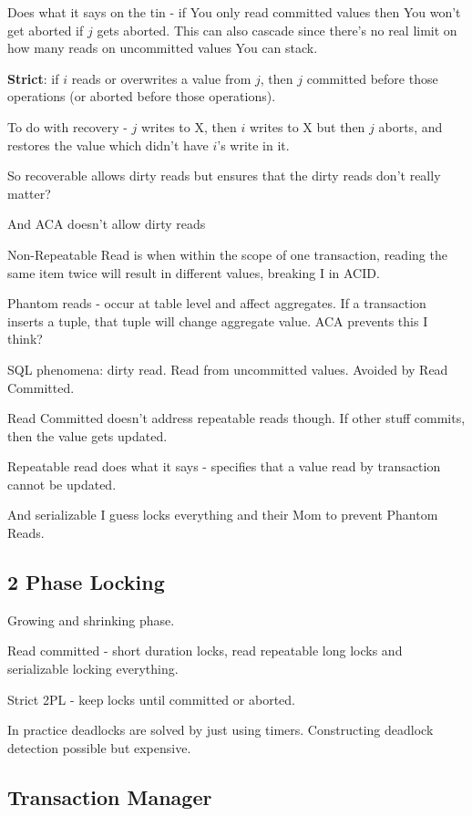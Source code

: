 \documentclass{article}
\begin{document}
		Does what it says on the tin - if You only read committed values then You won't get aborted if $j$ gets aborted. This can also cascade since there's no real limit on how many reads on uncommitted values You can stack.
		
		\textbf{Strict}: if $i$ reads or overwrites a value from $j$, then $j$ committed before those operations (or aborted before those operations).
		
		To do with recovery - $j$ writes to X, then $i$ writes to X but then $j$ aborts, and restores the value which didn't have $i$'s write in it.
		
		So recoverable allows dirty reads but ensures that the dirty reads don't really matter?
		
		And ACA doesn't allow dirty reads
		
		Non-Repeatable Read is when within the scope of one transaction, reading the same item twice will result in different values, breaking I in ACID.
		
		Phantom reads - occur at table level and affect aggregates. If a transaction inserts a tuple, that tuple will change aggregate value. ACA prevents this I think?
		
		SQL phenomena: dirty read. Read from uncommitted values. Avoided by Read Committed.
		
		Read Committed doesn't address repeatable reads though. If other stuff commits, then the value gets updated.
		
		Repeatable read does what it says - specifies that a value read by transaction cannot be updated.
		
		And serializable I guess locks everything and their Mom to prevent Phantom Reads.
		
	\subsection{2 Phase Locking}
		
		Growing and shrinking phase.
		
		Read committed - short duration locks, read repeatable long locks and serializable locking everything.
		
		Strict 2PL - keep locks until committed or aborted.
		
		In practice deadlocks are solved by just using timers. Constructing deadlock detection possible but expensive.
		
	\subsection{Transaction Manager}
	
\end{document}
